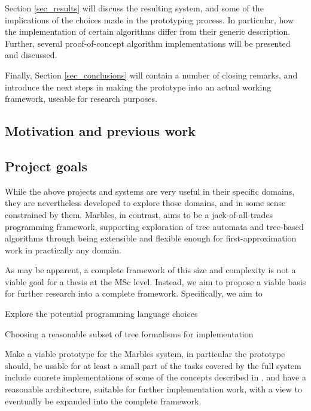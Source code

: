 Section \ref{sec_results} will discuss the resulting system, and some of
the implications of the choices made in the prototyping process. In
particular, how the implementation of certain algorithms differ from their
generic description. Further, several proof-of-concept algorithm
implementations will be presented and discussed.

Finally, Section \ref{sec_conclusions} will contain a number of closing
remarks, and introduce the next steps in making the prototype into an
actual working framework, useable for research purposes.

\subsection{Motivation and previous work}



\subsection{Project goals}

While the above projects and systems are very useful in their specific
domains, they are nevertheless developed to explore those domains, and in
some sense constrained by them. Marbles, in contrast, aims to be a
jack-of-all-trades programming framework, supporting exploration of tree
automata and tree-based algorithms through being extensible and flexible
enough for first-approximation work in practically any domain.

As may be apparent, a complete framework of this size and complexity is not
a viable goal for a thesis at the MSc level. Instead, we aim to propose a
viable basis for further research into a complete framework. Specifically,
we aim to
\begin{compactitem}
\item Explore the potential programming language choices
\item Choosing a reasonable subset of tree formalisms for implementation
\item Make a viable prototype for the Marbles system, in particular the
prototype should,
\subitem be usable for at least a small part of the tasks covered by the
full system
\subitem include conrete implementations of some of the concepts described in
\cite{drewes_marbles}, and
\subitem have a reasonable architecture, suitable for further
implementation work, with a view to eventually be expanded into the
complete framework.
\end{compactitem}






